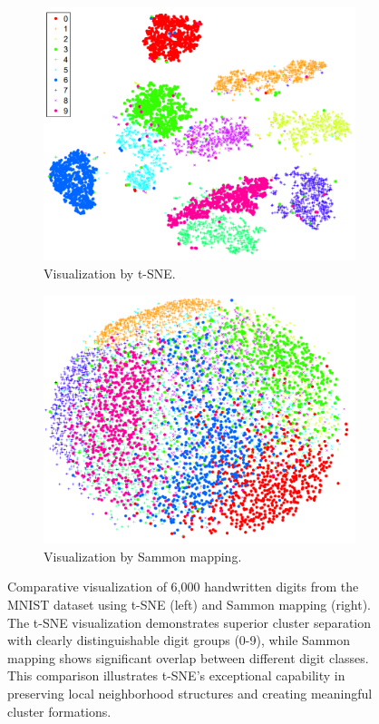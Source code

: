 \begin{figure}
    \centering
    \begin{subfigure}{0.45\textwidth}
        \centering
        \includegraphics[width=\linewidth]{images/t-sne1.png}
        \caption{Visualization by t-SNE.}
        \label{fig:tsne_mnist_basic_tsne}
    \end{subfigure}
    \hfill
    \begin{subfigure}{0.45\textwidth}
        \centering
        \includegraphics[width=\linewidth]{images/t-sne2.png}
        \caption{Visualization by Sammon mapping.}
        \label{fig:tsne_mnist_basic_sammon}
    \end{subfigure}
    \caption{Comparative visualization of 6,000 handwritten digits from the MNIST dataset using t-SNE (left) and Sammon mapping (right). The t-SNE visualization demonstrates superior cluster separation with clearly distinguishable digit groups (0-9), while Sammon mapping shows significant overlap between different digit classes. This comparison illustrates t-SNE's exceptional capability in preserving local neighborhood structures and creating meaningful cluster formations.}
    \label{fig:tsne_mnist_basic}
\end{figure}

